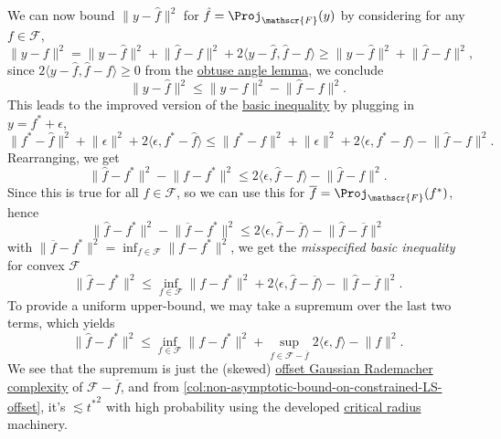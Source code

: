 We can now bound \(\lVert y - \hat{f} \rVert ^2\) for \(\hat{f} = \Proj_{\mathscr{F} }(y)\) by considering for any \(f\in \mathscr{F} \),
\[
	\lVert y - f \rVert ^2
	= \lVert y - \hat{f}  \rVert ^2 + \lVert \hat{f} - f \rVert ^2 + 2 \langle y - \hat{f} , \hat{f} - f \rangle
	\geq \lVert y - \hat{f}  \rVert ^2 + \lVert \hat{f} - f \rVert ^2,
\]
since \(2 \langle y - \hat{f} , \hat{f} - f \rangle \geq 0\) from the \hyperref[lma:obtuse-angle]{obtuse angle lemma}, we conclude
\[
	\lVert y - \hat{f} \rVert ^2
	\leq \lVert y - f \rVert ^2 - \lVert \hat{f} - f \rVert ^2.
\]
This leads to the improved version of the \hyperref[eq:basic-inequality]{basic inequality} by plugging in \(y = f^{\ast} + \epsilon \),
\[
	\lVert f^{\ast} - \hat{f}  \rVert ^2 + \lVert \epsilon  \rVert ^2 + 2 \langle \epsilon , f^{\ast} - \hat{f}  \rangle
	\leq \lVert f^{\ast} - f \rVert ^2 + \lVert \epsilon  \rVert ^2 + 2 \langle \epsilon , f^{\ast} - f \rangle - \lVert \hat{f} - f \rVert ^2.
\]
Rearranging, we get
\[
	\lVert \hat{f} - f^{\ast}  \rVert ^2 - \lVert f - f^{\ast}  \rVert ^2
	\leq 2 \langle \epsilon , \hat{f} - f \rangle - \lVert \hat{f} - f \rVert ^2.
\]
Since this is true for all \(f\in \mathscr{F} \), so we can use this for \(\overline{f} = \Proj_{\mathscr{F} } (f^{\ast} ) \), hence
\[
	\lVert \hat{f} - f^{\ast}  \rVert ^2 - \lVert \overline{f} - f^{\ast}  \rVert ^2
	\leq 2 \langle \epsilon , \hat{f} - \overline{f} \rangle - \lVert \hat{f} - \overline{f} \rVert ^2
\]
with \(\lVert \overline{f} - f^{\ast} \rVert ^2 = \inf _{f\in \mathscr{F} } \lVert f - f^{\ast} \rVert ^2\), we get the \emph{misspecified basic inequality} for convex \(\mathscr{F} \)
\begin{equation}\label{eq:misspecified-convex-basic-inequality}
	\lVert \hat{f} - f^{\ast} \rVert ^2
	\leq \inf _{f\in \mathscr{F} } \lVert f - f^{\ast}  \rVert ^2 + 2 \langle \epsilon , \hat{f} - \overline{f} \rangle - \lVert \hat{f} - \overline{f} \rVert ^2.
\end{equation}
To provide a uniform upper-bound, we may take a supremum over the last two terms, which yields
\[
	\lVert \hat{f} - f^{\ast} \rVert ^2
	\leq \inf _{f\in \mathscr{F} } \lVert f - f^{\ast}  \rVert ^2 + \sup _{f\in \mathscr{F} - \overline{f} } 2\langle \epsilon , f \rangle - \lVert f \rVert ^2.
\]
We see that the supremum is just the (skewed) \hyperref[def:offset-Gaussian-Rademacher-complexity]{offset Gaussian Rademacher complexity} of \(\mathscr{F} - \overline{f} \), and from \autoref{col:non-asymptotic-bound-on-constrained-LS-offset}, it's \( \lesssim {t^{\ast} }^2\) with high probability using the developed \hyperref[def:critical-radius]{critical radius} machinery.

